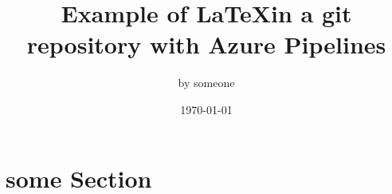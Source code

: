 \documentclass[a4paper]{article}
\title{Example of \LaTeX in a git repository with Azure Pipelines}
\author{by someone}
\affil{some institute}
\date{\today}
\begin{document}
\maketitle
\vspace{3em}
\tableofcontents
\pagebreak

\section{some Section}

\lipsum[1-3]

\printbibliography
\end{document}
